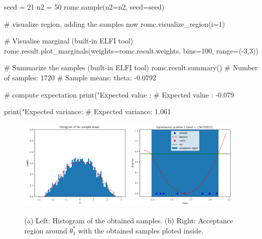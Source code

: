 \begin{pythoncode}
  seed = 21
  n2 = 50
  romc.sample(n2=n2, seed=seed)

  # visualize region, adding the samples now
  romc.visualize_region(i=1)

  # Visualise marginal (built-in ELFI tool)
  romc.result.plot_marginals(weights=romc.result.weights, bins=100, range=(-3,3))

  # Summarize the samples (built-in ELFI tool)
  romc.result.summary()
  # Number of samples: 1720
  # Sample means: theta: -0.0792

  # compute expectation
  print("Expected value   : %
  # Expected value   : -0.079

  print("Expected variance: %
  # Expected variance: 1.061
\end{pythoncode}

\begin{figure}[h]
    \begin{center}
      \includegraphics[width=0.48\textwidth]{./Thesis/images/chapter3/example_marginal.png}
      \includegraphics[width=0.48\textwidth]{./Thesis/images/chapter3/example_region_samples.png}
    \end{center}
  \caption{(a) Left: Histogram of the obtained samples. (b) Right: Acceptance region around $\theta_1^*$ with the obtained samples ploted inside.}
  \label{fig:example_sampling}
\end{figure}

